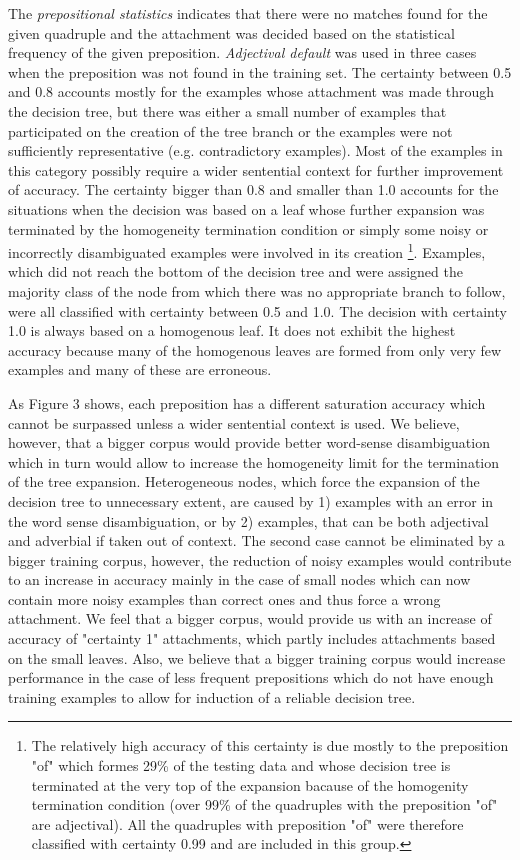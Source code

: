 The {\it prepositional statistics} indicates that there were no matches found for the given quadruple and the attachment was decided based on the statistical frequency of the given preposition. {\it Adjectival default} was used in three cases when the preposition was not found in the training set. The certainty between 0.5 and 0.8 accounts mostly for the examples whose attachment was made through the decision tree, but there was either a small number of examples that participated on the creation of the tree branch or the examples were not sufficiently representative (e.g. contradictory examples). Most of the examples in this category possibly require a wider sentential context for further improvement of accuracy. The certainty bigger than 0.8 and smaller than 1.0 accounts for the situations when the decision was based on a leaf whose further expansion was terminated by the homogeneity termination condition or simply some noisy or incorrectly disambiguated examples were involved in its creation
\footnote{The relatively high accuracy of this certainty is due mostly to the preposition "of" which formes 29\% of the testing data and whose decision tree is terminated at the very top of the expansion bacause of the homogenity termination condition (over 99\% of the quadruples with the preposition "of" are adjectival). All the quadruples with preposition "of" were therefore classified with certainty 0.99 and are included in this group.}. 
Examples, which did not reach the bottom of the decision tree and were assigned the majority class of the node from which there was no appropriate branch to follow, were all classified with certainty between 0.5 and 1.0. The decision with certainty 1.0 is always based on a homogenous leaf. It does not exhibit the highest accuracy because many of the homogenous leaves are formed from only very few examples and many of these are erroneous. 

As Figure 3 shows, each preposition has a different saturation accuracy which cannot be surpassed unless a wider sentential context is used. We believe, however, that a bigger corpus would provide better word-sense disambiguation which in turn would allow to increase the homogeneity limit for the termination of the tree expansion. Heterogeneous nodes, which force the expansion of the decision tree to unnecessary extent, are caused by 1) examples with an error in the word sense disambiguation, or by 2) examples, that can be both adjectival and adverbial if taken out of context. The second case cannot be eliminated by a bigger training corpus, however, the reduction of noisy examples would contribute to an increase in accuracy mainly in the case of small nodes which can now contain more noisy examples than correct ones and thus force a wrong attachment. We feel that a bigger corpus, would provide us with an increase of accuracy of "certainty 1" attachments, which partly includes attachments based on the small leaves. Also, we believe that a bigger training corpus would increase performance in the case of less frequent prepositions which do not have enough training examples to allow for induction of a reliable decision tree. 

